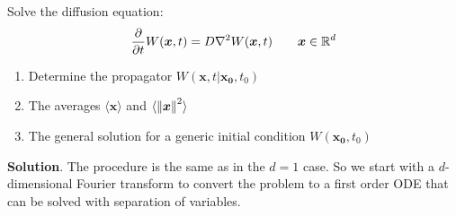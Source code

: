 \documentclass[../template.tex]{subfiles}
\begin{document}
\begin{exo}
    Solve the diffusion equation:
    \begin{align} \label{eqn:diff-d}
        \pdv{t} W(\bm{x},t) = D \nabla^2 W(\bm{x},t) \qquad \bm{x} \in \mathbb{R}^d
    \end{align}
    \begin{enumerate}
        \item Determine the propagator $W(\bm{x},t|\bm{x_0},t_0)$
        \item The averages $\langle \bm{x} \rangle$ and $\langle \norm{\bm{x}}^2 \rangle$
        \item The general solution for a generic initial condition $W(\bm{x_0},t_0)$
    \end{enumerate}
    
    \medskip
 
    \textbf{Solution}. The procedure is the same as in the $d=1$ case. So we start with a $d$-dimensional Fourier transform to convert the problem to a first order ODE that can be solved with separation of variables.


\end{exo}
\end{document}
